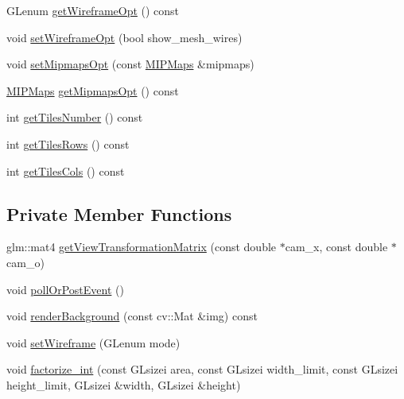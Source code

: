 \begin{DoxyCompactItemize}
\item 
G\+Lenum \mbox{\hyperlink{classSICAD_af65b5ad73e2c0e872face157b56bd68b}{get\+Wireframe\+Opt}} () const
\item 
void \mbox{\hyperlink{classSICAD_a4cf80a273b6b0d946cd298472c63ddd4}{set\+Wireframe\+Opt}} (bool show\+\_\+mesh\+\_\+wires)
\item 
void \mbox{\hyperlink{classSICAD_a1fa052a3609f52156b472e872e34971a}{set\+Mipmaps\+Opt}} (const \mbox{\hyperlink{classSICAD_a7e092dede6f660355462d6d548214198}{M\+I\+P\+Maps}} \&mipmaps)
\item 
\mbox{\hyperlink{classSICAD_a7e092dede6f660355462d6d548214198}{M\+I\+P\+Maps}} \mbox{\hyperlink{classSICAD_a8033a99745f595ea5205e3830cabc389}{get\+Mipmaps\+Opt}} () const
\item 
int \mbox{\hyperlink{classSICAD_a728f82ebbfeea54f3fef2fc0c56a4964}{get\+Tiles\+Number}} () const
\item 
int \mbox{\hyperlink{classSICAD_a9e3dd48dfd83ea0bd00d64dacc4fbd40}{get\+Tiles\+Rows}} () const
\item 
int \mbox{\hyperlink{classSICAD_a2ba3a0aeb3dab9996bdeed19a16eae56}{get\+Tiles\+Cols}} () const
\end{DoxyCompactItemize}
\subsection*{Private Member Functions}
\begin{DoxyCompactItemize}
\item 
glm\+::mat4 \mbox{\hyperlink{classSICAD_a1bdece095865249df4cb4e6a7ad2901e}{get\+View\+Transformation\+Matrix}} (const double $\ast$cam\+\_\+x, const double $\ast$cam\+\_\+o)
\item 
void \mbox{\hyperlink{classSICAD_a8238a2b2c488c8b7ba85d5b2a0bf00ac}{poll\+Or\+Post\+Event}} ()
\item 
void \mbox{\hyperlink{classSICAD_a46fcf7ddb480a788463a4d98d26e12e8}{render\+Background}} (const cv\+::\+Mat \&img) const
\item 
void \mbox{\hyperlink{classSICAD_ae7af7aba5d81b9f1cc3e273a55811a70}{set\+Wireframe}} (G\+Lenum mode)
\item 
void \mbox{\hyperlink{classSICAD_a2603ec5cb9a31bc7be0a335ef513ab0d}{factorize\+\_\+int}} (const G\+Lsizei area, const G\+Lsizei width\+\_\+limit, const G\+Lsizei height\+\_\+limit, G\+Lsizei \&width, G\+Lsizei \&height)
\end{DoxyCompactItemize}
